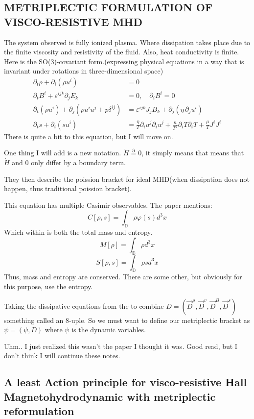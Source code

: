  \subsection{METRIPLECTIC FORMULATION OF VISCO-RESISTIVE MHD}
 The system observed is fully ionized plasma. Where dissipation takes place due to the finite viscosity and resistivity of the fluid. Also, heat conductivity is finite. Here is the SO(3)-covariant form.(expressing physical equations in a way that is invariant under rotations in three-dimensional space)
 \begin{align*}
\partial_t \rho + \partial_i (\rho u^i) &= 0 \\
\partial_t B^i + \varepsilon^{ijk} \partial_j E_k &= 0, \quad \partial_i B^i = 0 \\
\partial_t (\rho u^i) + \partial_j (\rho u^i u^j + p \delta^{ij}) &= \varepsilon^{ijk} J_j B_k + \partial_j (\eta \, \partial_j u^i) \\
\partial_t s + \partial_i (s u^i) &= \frac{\eta}{T} \partial_i u^j \partial_i u^j + \frac{\kappa}{T^2} \partial_i T \partial_i T + \frac{\mu}{T} J^i J^i
\end{align*}
There is quite a bit to this equation, but I will move on.

One thing I will add is a new notation. $\dot{H}\overset{\partial}{=}0$, it simply means that means that $\dot{H}$ and 0 only differ by a boundary term.

They then describe the poission bracket for ideal MHD(when dissipation does not happen, thus traditional poission bracket).

This equation has multiple Casimir observables. The paper mentions:
$$C[\rho, s]=\int_\mathbb{D}\rho\varphi(s)d^3x$$
Which within is both the total mass and entropy.
$$M[\rho]=\int_\mathbb{D}\rho d^3x$$
$$S[\rho,s]=\int_\mathbb{D}\rho s d^3x$$
Thus, mass and entropy are conserved. There are some other, but obviously for this purpose, use the entropy.

Taking the dissipative equations from the to combine $D=(\vec{D}^\rho, \vec{D}^v, \vec{D}^B, \vec{D}^s)$ something called an 8-uple. So we must want to define our metriplectic bracket as $\psi = (\psi, D)$ where $\psi$ is the dynamic variables.

Uhm.. I just realized this wasn't the paper I thought it was. Good read, but I don't think I will continue these notes.
\subsection{A least Action principle for visco-resistive Hall Magnetohydrodynamic with metriplectic reformulation}
